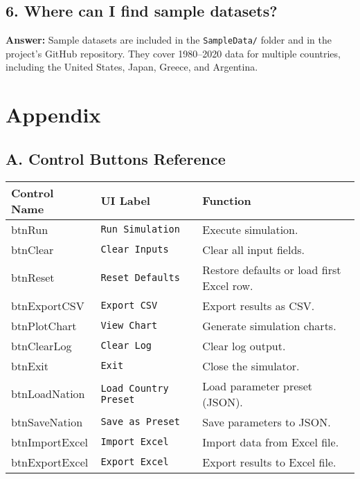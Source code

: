 \documentclass[12pt,a4paper]{article}
\begin{document}
\subsection*{6. Where can I find sample datasets?}
\textbf{Answer:}
Sample datasets are included in the \texttt{SampleData/} folder and in the project’s GitHub repository.  
They cover 1980–2020 data for multiple countries, including the United States, Japan, Greece, and Argentina.

\newpage
\section{Appendix}

\subsection{A. Control Buttons Reference}
\begin{longtable}{p{3cm} p{4cm} p{8cm}}
\toprule
\textbf{Control Name} & \textbf{UI Label} & \textbf{Function} \\
\midrule
btnRun & \texttt{Run Simulation} & Execute simulation. \\
btnClear & \texttt{Clear Inputs} & Clear all input fields. \\
btnReset & \texttt{Reset Defaults} & Restore defaults or load first Excel row. \\
btnExportCSV & \texttt{Export CSV} & Export results as CSV. \\
btnPlotChart & \texttt{View Chart} & Generate simulation charts. \\
btnClearLog & \texttt{Clear Log} & Clear log output. \\
btnExit & \texttt{Exit} & Close the simulator. \\
btnLoadNation & \texttt{Load Country Preset} & Load parameter preset (JSON). \\
btnSaveNation & \texttt{Save as Preset} & Save parameters to JSON. \\
btnImportExcel & \texttt{Import Excel} & Import data from Excel file. \\
btnExportExcel & \texttt{Export Excel} & Export results to Excel file. \\
\bottomrule
\end{longtable}
\end{document}
